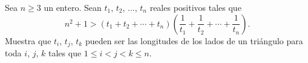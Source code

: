 Sea $n\geq 3$ un entero. Sean $t_1$, $t_2$, ..., $t_n$ reales positivos tales que \[n^2 + 1 \gt \left( t_1 + t_2 + \cdots + t_n \right) \left( \frac{1}{t_1} + \frac{1}{t_2} + \cdots + \frac{1}{t_n} \right).\] 
Muestra que $t_i$, $t_j$, $t_k$ pueden ser las longitudes de los lados de un triángulo para toda $i$, $j$, $k$ tales que $1 \leq i \lt j \lt k \leq n$.